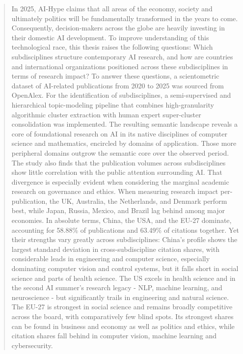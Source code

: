 \documentclass{article}
\begin{document}
	\begin{abstract}
		
		\vspace{1cm}
		
		In 2025, AI-Hype claims that all areas of the economy, society and ultimately politics will be fundamentally transformed in the years to come. Consequently, decision-makers across the globe are heavily investing in their domestic AI development. To improve understanding of this technological race, this thesis raises the following questions: Which subdisciplines structure contemporary AI research, and how are countries and international organizations positioned across these subdisciplines in terms of research impact? To answer these questions, a scientometric dataset of AI-related publications from 2020 to 2025 was sourced from OpenAlex. For the identification of subdisciplines, a semi-supervised and hierarchical topic-modeling pipeline that combines high-granularity algorithmic cluster extraction with human expert super-cluster consolidation was implemented. The resulting semantic landscape reveals a core of foundational research on AI in its native disciplines of computer science and mathematics, encircled by domains of application. Those more peripheral domains outgrow the semantic core over the observed period. The study also finds that the publication volumes across subdisciplines show little correlation with the public attention surrounding AI. That divergence is especially evident when considering the marginal academic research on governance and ethics. When measuring research impact per-publication, the UK, Australia, the Netherlands, and Denmark perform best, while Japan, Russia, Mexico, and Brazil lag behind among major economies. In absolute terms, China, the USA, and the EU-27 dominate, accounting for 58.88\% of publications and 63.49\% of citations together. Yet their strengths vary greatly across subdisciplines: China's profile shows the largest standard deviation in cross-subdiscipline citation shares, with considerable leads in engineering and computer science, especially dominating computer vision and control systems, but it falls short in social science and parts of health science. The US excels in health science and in the second AI summer's research legacy - NLP, machine learning, and neuroscience - but significantly trails in engineering and natural science. The EU-27 is strongest in social science and remains broadly competitive across the board, with comparatively few blind spots. Its strongest shares can be found in business and economy as well as politics and ethics, while citation shares fall behind in computer vision, machine learning and cybersecurity.
		
		
	\end{abstract}
	
\end{document}
